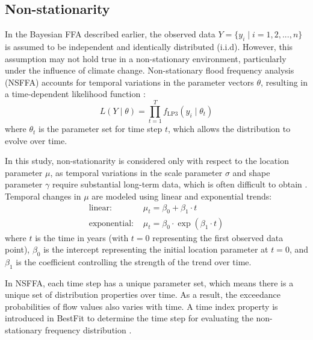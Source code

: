 \subsection{Non-stationarity}
\label{sec:nsffa}
In the Bayesian FFA described earlier, the observed data $Y = \{y_i \mid i = 1, 2, ..., n\}$ is assumed to be independent and identically distributed
(i.i.d). However, this assumption may not hold true in a non-stationary environment, particularly under the influence of climate change. Non-stationary flood frequency analysis (NSFFA) accounts for temporal variations in the parameter vectors $\theta$, resulting in a time-dependent likelihood function \citep{Smith_2024}:
$$L (Y \mid \theta) =\prod_{t=1}^T f_{\text{LP3}} (y_i \mid \theta_t)$$
where $\theta_t$ is the parameter set for time step $t$, which allows the distribution to evolve over time.

In this study, non-stationarity is considered only with respect to the location parameter $\mu$, as temporal variations in the scale parameter $\sigma$  and shape parameter $\gamma$ require substantial long-term data, which is often difficult to obtain \citep{Cheng_2014_b}. Temporal changes in $\mu$ are modeled using linear and exponential trends:
\begin{align*}
    \text{linear: } & \mu_t = \beta_0 + \beta_1 \cdot t\\
    \text{exponential: } & \mu_t = \beta_0 \cdot \exp (\beta_1 \cdot t)
\end{align*}
where $t$ is the time in years (with $t=0$ representing the first observed data point), $\beta_0$ is the intercept representing the initial location parameter at $t=0$, and $\beta_1$ is the coefficient controlling the strength of the trend over time. 

In NSFFA, each time step has a unique parameter set, which means there is a unique set of distribution properties over time. As a result, the exceedance probabilities of flow values also varies with time. A time index property is introduced in BestFit to determine the time step for evaluating the non-stationary frequency distribution \citep{Smith_2024}. 

\FloatBarrier
